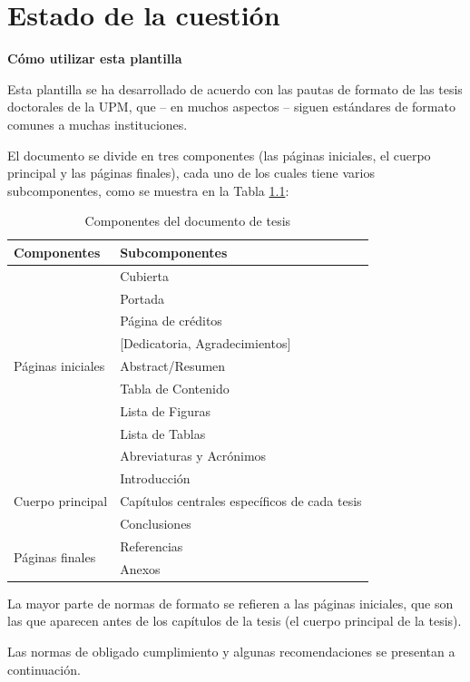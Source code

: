 %
\chapter{Estado de la cuestión}
\label{ch::capitulo2}

\textbf{Cómo utilizar esta plantilla}

Esta plantilla se ha desarrollado de acuerdo con las pautas de formato de las tesis doctorales de la UPM, que – en muchos aspectos – siguen estándares de formato comunes a muchas instituciones.

El documento se divide en tres componentes (las páginas iniciales, el cuerpo principal y las páginas finales), cada uno de los cuales tiene varios subcomponentes, como se muestra en la Tabla \ref{tab:thesisComp}:

\begin{table}[h]
\centering
    \caption{Componentes del documento de tesis}
    \label{tab:thesisComp}
\begin{tabularx}{\textwidth}{l l}
\toprule
\textbf{Componentes} & \textbf{Subcomponentes}\\
\midrule
\multirow{9}{10em}{Páginas iniciales} & Cubierta \\ 
 & Portada \\
  & Página de créditos \\
  & [Dedicatoria, Agradecimientos] \\
    & Abstract/Resumen \\
     & Tabla de Contenido \\
     & Lista de Figuras \\
     & Lista de Tablas \\
     & Abreviaturas y Acrónimos \\
\midrule 
\multirow{3}{10em}{Cuerpo principal} & Introducción \\ 
 & Capítulos centrales específicos de cada tesis \\
 & Conclusiones \\
\midrule
\multirow{2}{10em}{Páginas finales} & Referencias \\ 
     & Anexos\\
\bottomrule
    \end{tabularx}
\end{table}

La mayor parte de normas de formato se refieren a las páginas iniciales, que son las que aparecen antes de los capítulos de la tesis (el cuerpo principal de la tesis).

Las normas de obligado cumplimiento y algunas recomendaciones se presentan a continuación. 

